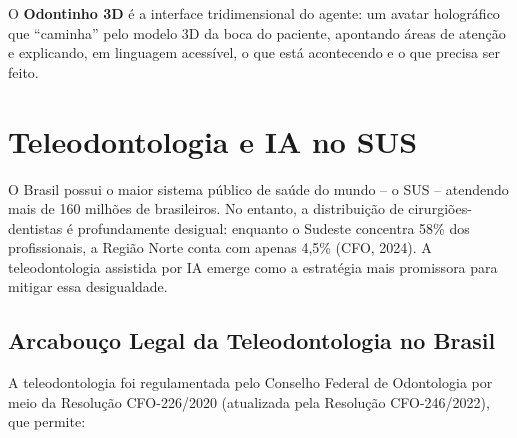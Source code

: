 O \textbf{Odontinho 3D} é a interface tridimensional do agente: um avatar
holográfico que ``caminha'' pelo modelo 3D da boca do paciente, apontando áreas
de atenção e explicando, em linguagem acessível, o que está acontecendo e o que
precisa ser feito.

\section{Teleodontologia e IA no SUS}
\label{sec:teleodontologia-sus}

\nivelquatro

O Brasil possui o maior sistema público de saúde do mundo -- o SUS -- atendendo
mais de 160 milhões de brasileiros. No entanto, a distribuição de
cirurgiões-dentistas é profundamente desigual: enquanto o Sudeste concentra 58\%
dos profissionais, a Região Norte conta com apenas 4,5\% (CFO, 2024). A
teleodontologia assistida por IA emerge como a estratégia mais promissora para
mitigar essa desigualdade.

 

\subsection{Arcabouço Legal da Teleodontologia no Brasil}

A teleodontologia foi regulamentada pelo Conselho Federal de Odontologia por
meio da Resolução CFO-226/2020 (atualizada pela Resolução CFO-246/2022), que
permite:

